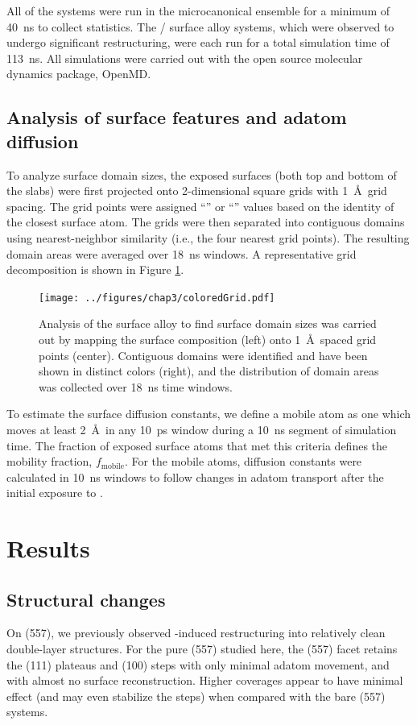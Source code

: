 All of the  systems were run in the microcanonical ensemble for
a minimum of 40~ns to collect statistics. The / surface
alloy systems, which were observed to undergo significant
restructuring, were each run for a total simulation time of 113~ns.
All simulations were carried out with the open source molecular
dynamics package, OpenMD.\citep{openmd, Meineke:2005pt}
 
\subsection{Analysis of surface features and adatom diffusion}
To analyze surface domain sizes, the exposed surfaces (both top and
bottom of the slabs) were first projected onto 2-dimensional square
grids with 1~\AA\ grid spacing. The grid points were assigned
``'' or ``'' values based on the identity of the closest
surface atom.  The grids were then separated into contiguous domains
using nearest-neighbor similarity (i.e., the four nearest grid
points). The resulting domain areas were averaged over 18~ns windows.
A representative grid decomposition is shown in Figure \ref{fig:grid}.

\begin{figure}[p!]
  \centering
  \texttt{[image: ../figures/chap3/coloredGrid.pdf]}
  \caption{Analysis of the surface alloy to find surface domain sizes
    was carried out by mapping the surface composition (left) onto
    1~\AA\ spaced grid points (center).  Contiguous domains were
    identified and have been shown in distinct colors (right), and the
    distribution of domain areas was collected over 18~ns time
    windows.}
\label{fig:grid}
\end{figure}

To estimate the surface diffusion constants, we define a mobile atom
as one which moves at least 2~\AA\ in any 10~ps window during a 10~ns
segment of simulation time.  The fraction of exposed surface atoms
that met this criteria defines the mobility fraction,
$f_\mathrm{mobile}$.  For the mobile atoms, diffusion constants were
calculated in 10~ns windows to follow changes in adatom transport
after the initial exposure to .

\section{Results}
\subsection{Structural changes}
On (557), we previously observed -induced restructuring
into relatively clean double-layer structures.\citep{Michalka:2013aa} For
the pure (557) studied here, the (557) facet retains the (111)
plateaus and (100) steps with only minimal adatom movement, and with
almost no surface reconstruction.  Higher  coverages appear to
have minimal effect (and may even stabilize the steps) when compared
with the bare (557) systems.

